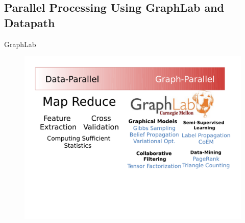 \documentclass[onlymath,xcolor=pdftex,dvipsnames,table]{beamer}
\begin{document}
\subsection{Parallel Processing Using GraphLab and Datapath}
\begin{frame}{GraphLab}
\begin{figure}
  \centering
  \includegraphics[clip,trim=20pt 150pt 20pt 30pt,width=.9\textwidth]{graphlab.pdf}
\end{figure}
\end{frame}


\end{document}
